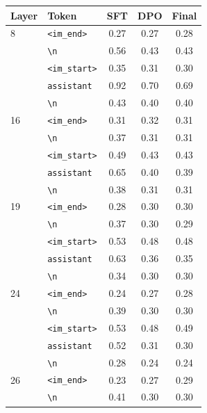 \begin{table}[!htbp]
\centering
\small
\begin{tabular}{llccc}
\toprule
Layer & Token & SFT & DPO & Final \\
\midrule
8 & \texttt{\textless{}\textbar{}im\_end\textbar{}\textgreater{}} & 0.27 & 0.27 & 0.28 \\
 & \texttt{\textbackslash n} & 0.56 & 0.43 & 0.43 \\
 & \texttt{\textless{}\textbar{}im\_start\textbar{}\textgreater{}} & 0.35 & 0.31 & 0.30 \\
 & \texttt{assistant} & 0.92 & 0.70 & 0.69 \\
 & \texttt{\textbackslash n} & 0.43 & 0.40 & 0.40 \\
\midrule
16 & \texttt{\textless{}\textbar{}im\_end\textbar{}\textgreater{}} & 0.31 & 0.32 & 0.31 \\
 & \texttt{\textbackslash n} & 0.37 & 0.31 & 0.31 \\
 & \texttt{\textless{}\textbar{}im\_start\textbar{}\textgreater{}} & 0.49 & 0.43 & 0.43 \\
 & \texttt{assistant} & 0.65 & 0.40 & 0.39 \\
 & \texttt{\textbackslash n} & 0.38 & 0.31 & 0.31 \\
\midrule
19 & \texttt{\textless{}\textbar{}im\_end\textbar{}\textgreater{}} & 0.28 & 0.30 & 0.30 \\
 & \texttt{\textbackslash n} & 0.37 & 0.30 & 0.29 \\
 & \texttt{\textless{}\textbar{}im\_start\textbar{}\textgreater{}} & 0.53 & 0.48 & 0.48 \\
 & \texttt{assistant} & 0.63 & 0.36 & 0.35 \\
 & \texttt{\textbackslash n} & 0.34 & 0.30 & 0.30 \\
\midrule
24 & \texttt{\textless{}\textbar{}im\_end\textbar{}\textgreater{}} & 0.24 & 0.27 & 0.28 \\
 & \texttt{\textbackslash n} & 0.39 & 0.30 & 0.30 \\
 & \texttt{\textless{}\textbar{}im\_start\textbar{}\textgreater{}} & 0.53 & 0.48 & 0.49 \\
 & \texttt{assistant} & 0.52 & 0.31 & 0.30 \\
 & \texttt{\textbackslash n} & 0.28 & 0.24 & 0.24 \\
\midrule
26 & \texttt{\textless{}\textbar{}im\_end\textbar{}\textgreater{}} & 0.23 & 0.27 & 0.29 \\
 & \texttt{\textbackslash n} & 0.41 & 0.30 & 0.30 \\

\end{tabular}
\end{table}
